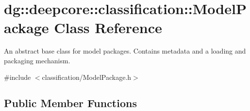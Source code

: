 \hypertarget{classdg_1_1deepcore_1_1classification_1_1_model_package}{}\section{dg\+:\+:deepcore\+:\+:classification\+:\+:Model\+Package Class Reference}
\label{classdg_1_1deepcore_1_1classification_1_1_model_package}


An abstract base class for model packages. Contains metadata and a loading and packaging mechanism.  




{\ttfamily \#include $<$classification/\+Model\+Package.\+h$>$}

\subsection*{Public Member Functions}
